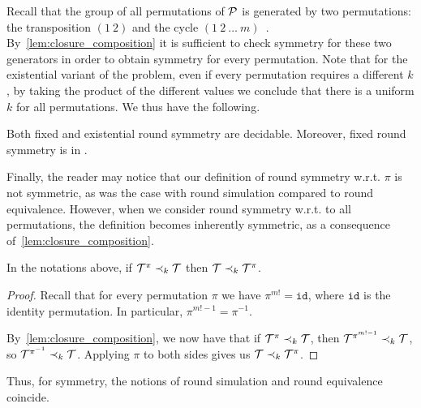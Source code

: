 Recall that the group of all permutations of $\mathcal{P}$ is generated by two permutations: the transposition $(1\ 2)$ and the cycle $(1\ 2\ \ldots\ m)$~\cite{Cameron1999}. By~\cref{lem:closure_composition} it is sufficient to check symmetry for these two generators in order to obtain symmetry for every permutation. Note that for the existential variant of the problem, even if every permutation requires a different $k$, by taking the product of the different values we conclude that there is a uniform $k$ for all permutations.
We thus have the following.
\begin{theorem}
\label{thm:symmetry_decidable}
Both fixed and existential round symmetry are decidable. Moreover, fixed round symmetry is in \PSPACE.
\end{theorem}

Finally, the reader may notice that our definition of round symmetry w.r.t. $\pi$ is not symmetric, as was the case with round simulation compared to round equivalence. However, when we consider round symmetry w.r.t.\! to all permutations, the definition becomes inherently symmetric, as a consequence of~\cref{lem:closure_composition}.
\begin{lemma}
\label{lem:round_symmetry_commutative}
    In the notations above, if $\mathcal{T}^{\pi}\prec_k \mathcal{T}$ then $\mathcal{T}\prec_k \mathcal{T}^\pi$.
\end{lemma}
\begin{proof}
    Recall that for every permutation $\pi$ we have $\pi^{m!}=\mathtt{id}$, where $\mathtt{id}$ is the identity permutation. In particular, $\pi^{m!-1}=\pi^{-1}$. 

    By~\cref{lem:closure_composition}, we now have that if $\mathcal{T}^{\pi}\prec_k \mathcal{T}$, then $\mathcal{T}^{\pi^{m!-1}}\prec_k \mathcal{T}$, so $\mathcal{T}^{\pi^{-1}}\prec_k \mathcal{T}$. Applying $\pi$ to both sides gives us $\mathcal{T}\prec_k \mathcal{T}^{\pi}$.
\end{proof}

Thus, for symmetry, the notions of round simulation and round equivalence coincide.
